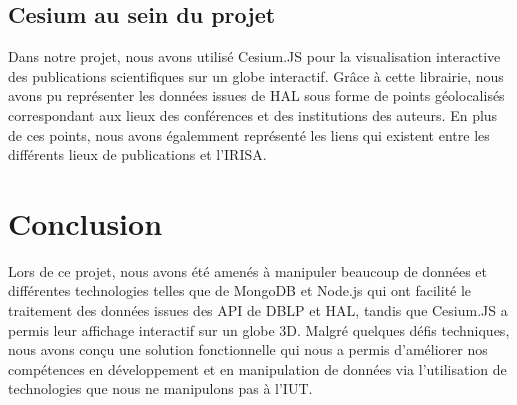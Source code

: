 \documentclass[a4paper,12pt]{article}
\begin{document}
\subsection{Cesium au sein du projet}
Dans notre projet, nous avons utilisé Cesium.JS pour la visualisation interactive des publications scientifiques sur un globe interactif. Grâce à cette librairie, nous avons pu représenter les données issues de HAL sous forme de points géolocalisés 
correspondant aux lieux des conférences et des institutions des auteurs. En plus de ces points, nous avons égalemment représenté les liens qui existent entre les différents lieux de publications et l'IRISA.


\section{Conclusion}
Lors de ce projet, nous avons été amenés à manipuler beaucoup de données et différentes technologies telles que de MongoDB et Node.js qui ont facilité le traitement des données issues des API de DBLP et HAL, tandis que Cesium.JS a permis leur affichage 
interactif sur un globe 3D. Malgré quelques défis techniques, nous avons conçu une solution fonctionnelle qui nous a permis d'améliorer nos compétences en développement et en manipulation de données via l'utilisation de technologies que nous ne 
manipulons pas à l'IUT.

\newpage
\end{document}

